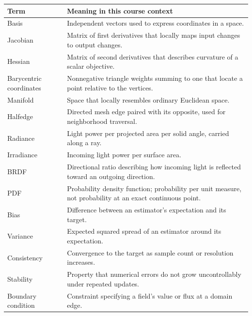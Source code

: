 {\def\LTcaptype{none} %
\begin{longtable}[]{@{}
  >{\raggedright\arraybackslash}p{}
  >{\raggedright\arraybackslash}p{}@{}}
\toprule\noalign{}
\begin{minipage}[b]{\linewidth}\raggedright
Term
\end{minipage} & \begin{minipage}[b]{\linewidth}\raggedright
Meaning in this course context
\end{minipage} \\
\midrule\noalign{}
\endhead
\bottomrule\noalign{}
\endlastfoot
Basis & Independent vectors used to express coordinates in a space. \\
Jacobian & Matrix of first derivatives that locally maps input changes to output changes. \\
Hessian & Matrix of second derivatives that describes curvature of a scalar objective. \\
Barycentric coordinates & Nonnegative triangle weights summing to one that locate a point relative to the vertices. \\
Manifold & Space that locally resembles ordinary Euclidean space. \\
Halfedge & Directed mesh edge paired with its opposite, used for neighborhood traversal. \\
Radiance & Light power per projected area per solid angle, carried along a ray. \\
Irradiance & Incoming light power per surface area. \\
BRDF & Directional ratio describing how incoming light is reflected toward an outgoing direction. \\
PDF & Probability density function; probability per unit measure, not probability at an exact continuous point. \\
Bias & Difference between an estimator's expectation and its target. \\
Variance & Expected squared spread of an estimator around its expectation. \\
Consistency & Convergence to the target as sample count or resolution increases. \\
Stability & Property that numerical errors do not grow uncontrollably under repeated updates. \\
Boundary condition & Constraint specifying a field's value or flux at a domain edge. \\
\end{longtable}
}


